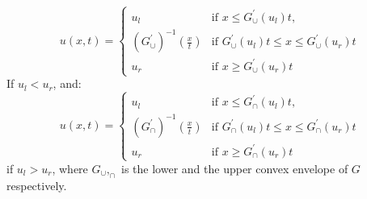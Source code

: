 \begin{equation}
u(x,t) = \left\{
\begin{array}{rl}
u_{l} & \text{if } x \leq G^{\prime}_{\cup}(u_{l})t,\\
(G^{\prime}_{\cup})^{-1}(\frac{x}{t}) & \text{if }G^{\prime}_{\cup}(u_{l})t\leq x \leq G^{\prime}_{\cup}(u_{r})t\\
u_{r} & \text{if } x \geq G^{\prime}_{\cup}(u_{r})t
\end{array} \right.
\end{equation}
If $u_{l}<u_{r}$, and:
\begin{equation}
u(x,t) = \left\{
\begin{array}{rl}
u_{l} & \text{if } x \leq G^{\prime}_{\cap}(u_{l})t,\\
(G^{\prime}_{\cap})^{-1}(\frac{x}{t}) & \text{if }G^{\prime}_{\cap}(u_{l})t\leq x \leq G^{\prime}_{\cap}(u_{r})t\\
u_{r} & \text{if } x \geq G^{\prime}_{\cap}(u_{r})t
\end{array} \right.
\end{equation}
if $u_{l}>u_{r}$,
 where $G_{\cup},_\cap $ is the lower and the upper convex envelope of $G$ respectively.


